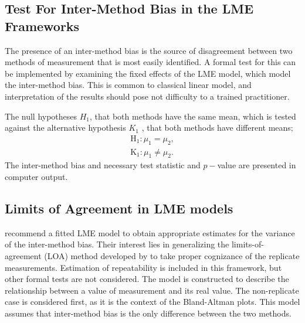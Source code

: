 \documentclass[12pt, a4paper]{report}
\theoremstyle{plain}
\theoremstyle{definition}
\theoremstyle{remark}
\begin{document}
	
	
	
	
	\subsection{Test For Inter-Method Bias in the LME Frameworks}
	The presence of an inter-method bias is the source of disagreement between two methods of measurement that is most easily identified. A formal test for this can be implemented by examining the fixed effects of the LME model, which model the inter-method bias. This is common to classical linear model, and interpretation of the results should pose not difficulty to a trained practitioner.
	
	The null hypotheses $H_1$, that both methods have the same mean, which is tested against the alternative hypothesis $K_1$ , that both methods have different means;
	\begin{eqnarray}
	\operatorname{H_1} : \mu_1 = \mu_2 ,\\
	\operatorname{K_1} : \mu_1 \neq \mu_2.
	\end{eqnarray}
	The inter-method bias and necessary test statistic and $p-$value are presented in computer output. 
	
	\subsection{Limits of Agreement in LME models}
%	
	
\citet{BXC2008} recommend a fitted LME model to obtain appropriate estimates for the variance of the inter-method bias. Their interest lies in generalizing the limits-of-agreement (LOA) method developed by \citet{BA86} to take proper cognizance of the replicate measurements.  Estimation of repeatability is included in this framework, but other formal tests are not considered. The model is constructed to describe the relationship between a value of measurement and its real value. The non-replicate case is considered first, as it is the context of the Bland-Altman plots. This model assumes that inter-method bias is the only difference between the two methods.		
\end{document}
